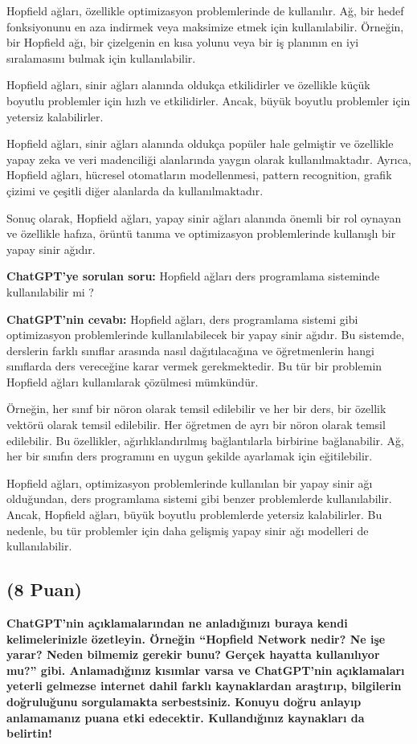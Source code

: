 \documentclass[11pt]{article}
\begin{document}
Hopfield ağları, özellikle optimizasyon problemlerinde de kullanılır. Ağ, bir hedef fonksiyonunu en aza indirmek veya maksimize etmek için kullanılabilir. Örneğin, bir Hopfield ağı, bir çizelgenin en kısa yolunu veya bir iş planının en iyi sıralamasını bulmak için kullanılabilir.

Hopfield ağları, sinir ağları alanında oldukça etkilidirler ve özellikle küçük boyutlu problemler için hızlı ve etkilidirler. Ancak, büyük boyutlu problemler için yetersiz kalabilirler.

Hopfield ağları, sinir ağları alanında oldukça popüler hale gelmiştir ve özellikle yapay zeka ve veri madenciliği alanlarında yaygın olarak kullanılmaktadır. Ayrıca, Hopfield ağları, hücresel otomatların modellenmesi, pattern recognition, grafik çizimi ve çeşitli diğer alanlarda da kullanılmaktadır.

Sonuç olarak, Hopfield ağları, yapay sinir ağları alanında önemli bir rol oynayan ve özellikle hafıza, örüntü tanıma ve optimizasyon problemlerinde kullanışlı bir yapay sinir ağıdır.

\textbf{ChatGPT'ye sorulan soru: } Hopfield ağları ders programlama sisteminde kullanılabilir mi ? 


\textbf{ChatGPT'nin cevabı: }Hopfield ağları, ders programlama sistemi gibi optimizasyon problemlerinde kullanılabilecek bir yapay sinir ağıdır. Bu sistemde, derslerin farklı sınıflar arasında nasıl dağıtılacağına ve öğretmenlerin hangi sınıflarda ders vereceğine karar vermek gerekmektedir. Bu tür bir problemin Hopfield ağları kullanılarak çözülmesi mümkündür.

Örneğin, her sınıf bir nöron olarak temsil edilebilir ve her bir ders, bir özellik vektörü olarak temsil edilebilir. Her öğretmen de ayrı bir nöron olarak temsil edilebilir. Bu özellikler, ağırlıklandırılmış bağlantılarla birbirine bağlanabilir. Ağ, her bir sınıfın ders programını en uygun şekilde ayarlamak için eğitilebilir.

Hopfield ağları, optimizasyon problemlerinde kullanılan bir yapay sinir ağı olduğundan, ders programlama sistemi gibi benzer problemlerde kullanılabilir. Ancak, Hopfield ağları, büyük boyutlu problemlerde yetersiz kalabilirler. Bu nedenle, bu tür problemler için daha gelişmiş yapay sinir ağı modelleri de kullanılabilir.

\subsection{(8 Puan)} \textbf{ChatGPT’nin açıklamalarından ne anladığınızı buraya kendi kelimelerinizle özetleyin. Örneğin ``Hopfield Network nedir? Ne işe yarar? Neden bilmemiz gerekir bunu? Gerçek hayatta kullanılıyor mu?'' gibi. Anlamadığınız kısımlar varsa ve ChatGPT’nin açıklamaları yeterli gelmezse internet dahil farklı kaynaklardan araştırıp, bilgilerin doğruluğunu sorgulamakta serbestsiniz. Konuyu doğru anlayıp anlamamanız puana etki edecektir. Kullandığınız kaynakları da belirtin!}
\end{document}
